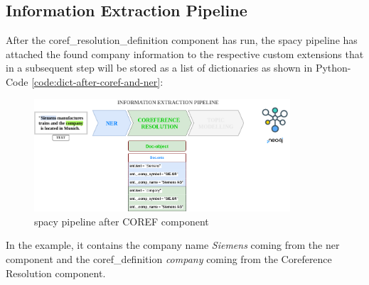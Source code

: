 \subsection{Information Extraction Pipeline}
After the \gls{coref_resolution_definition} component has run, the spacy pipeline has attached the found company information to the respective custom extensions
that in a subsequent step will be stored as a list of dictionaries as shown in Python-Code \ref{code:dict-after-coref-and-ner}:
\begin{figure}[H]   %
    \centering
    \includegraphics[width=0.85\textwidth]{Assets/pipelineCoref}
    \caption{spacy pipeline after COREF component}
    \label{fig:pipeCoref}
\end{figure}
In the example, it contains the company name \emph{Siemens} coming from the \gls{ner} component and the \gls{coref_definition} \emph{company} coming from the Coreference Resolution component.
















